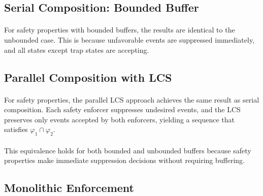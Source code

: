 \subsection{Serial Composition: Bounded Buffer}
\paragraph{}
For safety properties with bounded buffers, the results are identical to the unbounded case. This is because unfavorable events are suppressed immediately, and all states except trap states are accepting.

\subsection{Parallel Composition with LCS}

\paragraph{} 
For safety properties, the parallel LCS approach achieves the same result as serial composition. Each safety enforcer suppresses undesired events, and the LCS preserves only events accepted by both enforcers, yielding a sequence that satisfies $\varphi_1 \cap \varphi_2$.

\paragraph{}
This equivalence holds for both bounded and unbounded buffers because safety properties make immediate suppression decisions without requiring buffering.

\subsection{Monolithic Enforcement}

